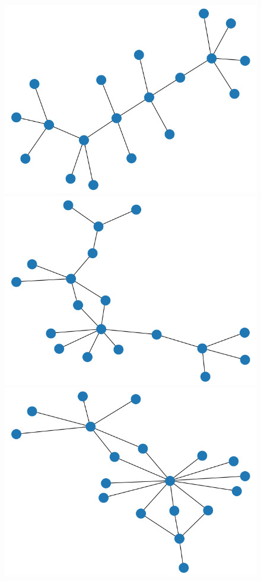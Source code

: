 \documentclass[11pt,english]{article}
\theoremstyle{plain}
\theoremstyle{remark}
\begin{document}
\begin{figure}[hbt]
    \includegraphics[scale=0.2]{timeline/state6.png}
    \includegraphics[scale=0.2]{timeline/state7.png}
    \includegraphics[scale=0.2]{timeline/state8.png}

\end{figure}
\end{document}
